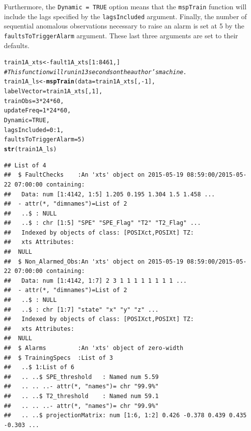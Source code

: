 \documentclass{report}\usepackage[]{graphicx}\usepackage[]{color}
\makeatletter
\newcommand{\hlnum}[1]{\textcolor[rgb]{0.686,0.059,0.569}{#1}}%
\newcommand{\hlcom}[1]{\textcolor[rgb]{0.678,0.584,0.686}{\textit{#1}}}%
\newcommand{\hlopt}[1]{\textcolor[rgb]{0,0,0}{#1}}%
\newcommand{\hlstd}[1]{\textcolor[rgb]{0.345,0.345,0.345}{#1}}%
\newcommand{\hlkwb}[1]{\textcolor[rgb]{0.69,0.353,0.396}{#1}}%
\newcommand{\hlkwc}[1]{\textcolor[rgb]{0.333,0.667,0.333}{#1}}%
\newcommand{\hlkwd}[1]{\textcolor[rgb]{0.737,0.353,0.396}{\textbf{#1}}}%
\newenvironment{kframe}{%
 \def\at@end@of@kframe{}%
 \ifinner\ifhmode%
  \def\at@end@of@kframe{\end{minipage}}%
  \begin{minipage}{\columnwidth}%
 \fi\fi%
 \def\FrameCommand##1{\hskip\@totalleftmargin \hskip-\fboxsep
 \colorbox{shadecolor}{##1}\hskip-\fboxsep
     \hskip-\linewidth \hskip-\@totalleftmargin \hskip\columnwidth}%
 \MakeFramed {\advance\hsize-\width
   \@totalleftmargin\z@ \linewidth\hsize
   \@setminipage}}%
 {\par\unskip\endMakeFramed%
 \at@end@of@kframe}
\newenvironment{knitrout}{}{} %
\makeatother
\begin{document}
Furthermore, the \texttt{Dynamic = TRUE} option means that the \texttt{mspTrain} function will include the lags specified by the \texttt{lagsIncluded} argument. Finally, the number of sequential anomalous observations necessary to raise an alarm is set at 5 by the \texttt{faultsToTriggerAlarm} argument. These last three arguments are set to their defaults.
\begin{knitrout}
\color{fgcolor}\begin{kframe}
\begin{alltt}
\hlstd{train1A_xts} \hlkwb{<-} \hlstd{fault1A_xts[}\hlnum{1}\hlopt{:}\hlnum{8461}\hlstd{,]}
\hlcom{# This function will run in 13 seconds on the author's machine.}
\hlstd{train1A_ls} \hlkwb{<-} \hlkwd{mspTrain}\hlstd{(}\hlkwc{data} \hlstd{= train1A_xts[,}\hlopt{-}\hlnum{1}\hlstd{],}
                       \hlkwc{labelVector} \hlstd{= train1A_xts[,}\hlnum{1}\hlstd{],}
                       \hlkwc{trainObs} \hlstd{=} \hlnum{3} \hlopt{*} \hlnum{24} \hlopt{*} \hlnum{60}\hlstd{,}
                       \hlkwc{updateFreq} \hlstd{=} \hlnum{1} \hlopt{*} \hlnum{24} \hlopt{*} \hlnum{60}\hlstd{,}
                       \hlkwc{Dynamic} \hlstd{=} \hlnum{TRUE}\hlstd{,}
                       \hlkwc{lagsIncluded} \hlstd{=} \hlnum{0}\hlopt{:}\hlnum{1}\hlstd{,}
                       \hlkwc{faultsToTriggerAlarm} \hlstd{=} \hlnum{5}\hlstd{)}
\hlkwd{str}\hlstd{(train1A_ls)}
\end{alltt}
\begin{verbatim}
## List of 4
##  $ FaultChecks    :An 'xts' object on 2015-05-19 08:59:00/2015-05-22 07:00:00 containing:
##   Data: num [1:4142, 1:5] 1.205 0.195 1.304 1.5 1.458 ...
##  - attr(*, "dimnames")=List of 2
##   ..$ : NULL
##   ..$ : chr [1:5] "SPE" "SPE_Flag" "T2" "T2_Flag" ...
##   Indexed by objects of class: [POSIXct,POSIXt] TZ:
##   xts Attributes:
##  NULL
##  $ Non_Alarmed_Obs:An 'xts' object on 2015-05-19 08:59:00/2015-05-22 07:00:00 containing:
##   Data: num [1:4142, 1:7] 2 3 1 1 1 1 1 1 1 1 ...
##  - attr(*, "dimnames")=List of 2
##   ..$ : NULL
##   ..$ : chr [1:7] "state" "x" "y" "z" ...
##   Indexed by objects of class: [POSIXct,POSIXt] TZ:
##   xts Attributes:
##  NULL
##  $ Alarms         :An 'xts' object of zero-width
##  $ TrainingSpecs  :List of 3
##   ..$ 1:List of 6
##   .. ..$ SPE_threshold   : Named num 5.59
##   .. .. ..- attr(*, "names")= chr "99.9%"
##   .. ..$ T2_threshold    : Named num 59.1
##   .. .. ..- attr(*, "names")= chr "99.9%"
##   .. ..$ projectionMatrix: num [1:6, 1:2] 0.426 -0.378 0.439 0.435 -0.303 ...

\end{verbatim}
\end{kframe}
\end{knitrout}
\end{document}
